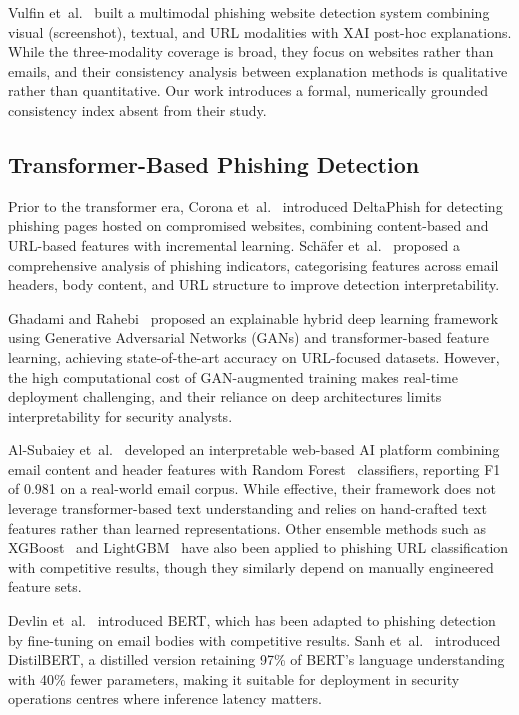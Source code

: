 \documentclass[conference]{IEEEtran}
\begin{document}
Vulfin et~al.~\cite{vulfin2025} built a multimodal phishing website detection
system combining visual (screenshot), textual, and URL modalities with
XAI post-hoc explanations. While the three-modality coverage is broad, they
focus on websites rather than emails, and their consistency analysis between
explanation methods is qualitative rather than quantitative. Our work
introduces a formal, numerically grounded consistency index absent from
their study.

\subsection{Transformer-Based Phishing Detection}

Prior to the transformer era, Corona et~al.~\cite{corona2017} introduced DeltaPhish for detecting phishing pages hosted on compromised websites, combining content-based and URL-based features with incremental learning. Sch\"{a}fer et~al.~\cite{schafer2016} proposed a comprehensive analysis of phishing indicators, categorising features across email headers, body content, and URL structure to improve detection interpretability.

Ghadami and Rahebi~\cite{ghadami2025} proposed an explainable hybrid deep
learning framework using Generative Adversarial Networks (GANs) and
transformer-based feature learning, achieving state-of-the-art accuracy on
URL-focused datasets. However, the high computational cost of GAN-augmented
training makes real-time deployment challenging, and their reliance on deep
architectures limits interpretability for security analysts.

Al-Subaiey et~al.~\cite{alsubaiey2024} developed an interpretable web-based
AI platform combining email content and header features with Random Forest~\cite{breiman2001}
classifiers, reporting F1 of 0.981 on a real-world email corpus. While
effective, their framework does not leverage transformer-based text
understanding and relies on hand-crafted text features rather than learned
representations. Other ensemble methods such as XGBoost~\cite{chen2016} and LightGBM~\cite{ke2017} have also been applied to phishing URL classification with competitive results, though they similarly depend on manually engineered feature sets.

Devlin et~al.~\cite{devlin2019} introduced BERT, which has been adapted to
phishing detection by fine-tuning on email bodies with competitive results.
Sanh et~al.~\cite{sanh2019} introduced DistilBERT, a distilled version
retaining 97\% of BERT's language understanding with 40\% fewer parameters,
making it suitable for deployment in security operations centres where
inference latency matters.
\end{document}
